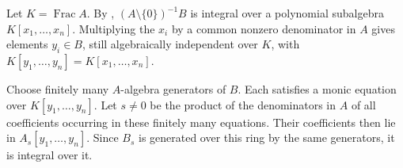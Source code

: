 Let $K=\operatorname{Frac}A$. By , $(A\setminus\{0\})^{-1}B$ is integral over a polynomial subalgebra $K[x_1,\ldots,x_n]$. Multiplying the $x_i$ by a common nonzero denominator in $A$ gives elements $y_i\in B$, still algebraically independent over $K$, with $K[y_1,\ldots,y_n]=K[x_1,\ldots,x_n]$.

Choose finitely many $A$-algebra generators of $B$. Each satisfies a monic equation over $K[y_1,\ldots,y_n]$. Let $s\neq0$ be the product of the denominators in $A$ of all coefficients occurring in these finitely many equations. Their coefficients then lie in $A_s[y_1,\ldots,y_n]$. Since $B_s$ is generated over this ring by the same generators, it is integral over it.
